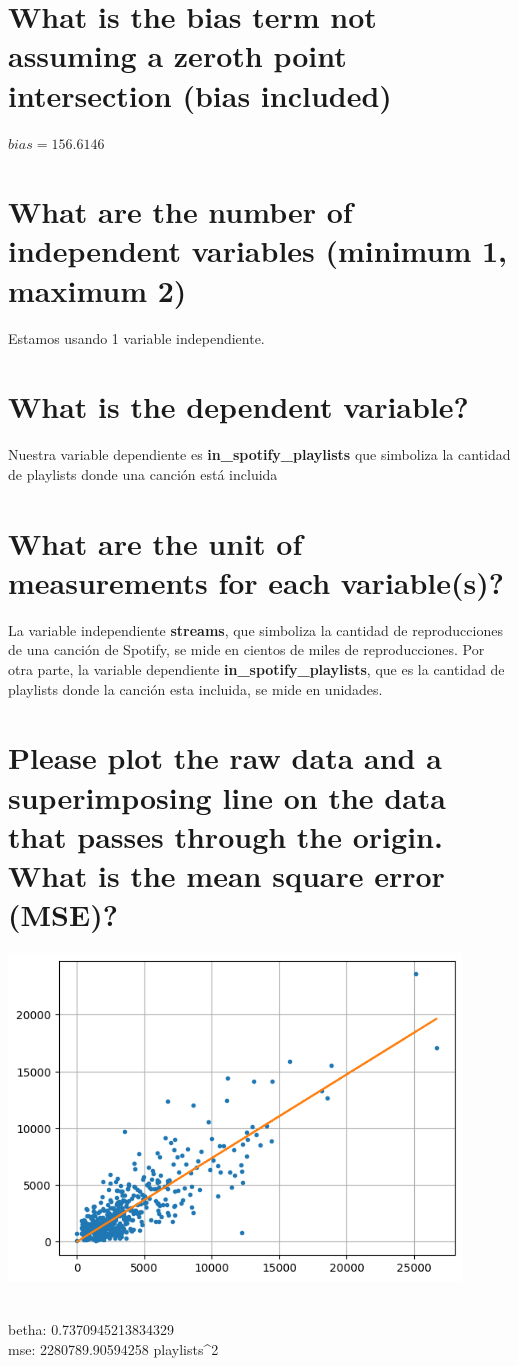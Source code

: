 \documentclass{report}
\begin{document}
        \section{What is the bias term not assuming a zero\-th point intersection (bias included)}
            $ bias = 156.6146 $
        \section{What are the number of independent variables (minimum 1, maximum 2)}
            Estamos usando 1 variable independiente.

        \section{What is the dependent variable?}
            Nuestra variable dependiente es \textbf{in\_spotify\_playlists} que simboliza la cantidad de playlists donde una canci\'on est\'a incluida

        \section{What are the unit of measurements for each variable(s)?}
            La variable independiente \textbf{streams}, que simboliza la cantidad de reproducciones de una canci\'on de Spotify, se mide en cientos de miles de reproducciones. Por otra parte, la variable dependiente \textbf{in\_spotify\_playlists}, que es la cantidad de playlists donde la canci\'on esta incluida, se mide en unidades.

        \section{Please plot the raw data and a superimposing line on the data that passes through the origin. What is the mean square error (MSE)?}
            {\includegraphics[width=0.9\textwidth]{latex/question9.png}\par} \\
            betha: 0.7370945213834329 \\
            mse: 2280789.90594258 playlists^2
\end{document}

